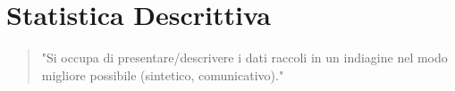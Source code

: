 \section{Statistica Descrittiva}

\begin{quotation}
	"Si occupa di presentare/descrivere i dati raccoli in un indiagine nel modo migliore possibile (sintetico, comunicativo)."
\end{quotation}